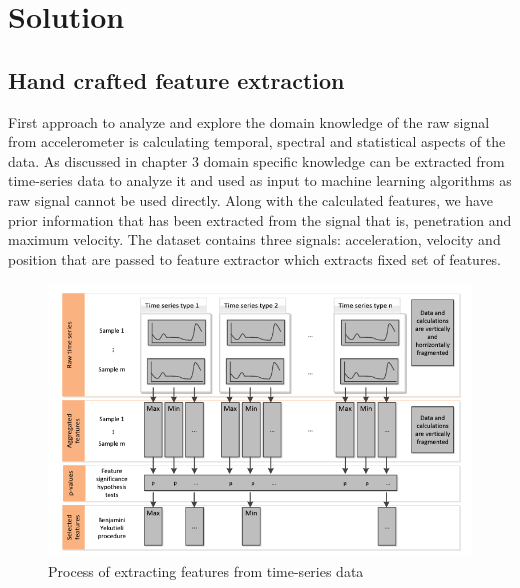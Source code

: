

    \chapter{Solution}

   \section{Hand crafted feature extraction}  
   First approach to analyze and explore the domain knowledge of the raw signal from accelerometer is calculating temporal, spectral and statistical aspects of the data. As discussed in chapter 3 domain specific knowledge can be extracted from time-series data to analyze it and used as input to machine learning algorithms as raw signal cannot be used directly. Along with the calculated features, we have prior information that has been extracted from the signal that is, penetration and maximum velocity. The dataset contains three signals: acceleration, velocity and position that are passed to feature extractor which extracts fixed set of features.
   
      \begin{figure}
      	\centering
      	\includegraphics[width=1.2\linewidth]{images/hcta.png}
      	\caption{Process of extracting features from time-series data \cite{christ2016distributed}}
      	\label{n0}
      \end{figure}
   
